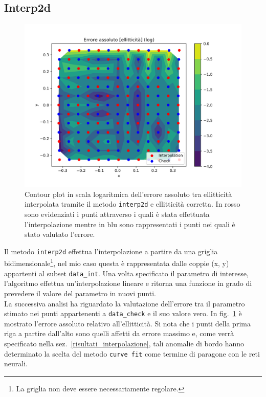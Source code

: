 \documentclass[12pt,a4paper,final]{book}
\begin{document}
\subsection{Interp2d}\label{interp2d}
\begin{figure}[t]
	\centering
	\includegraphics[scale=0.8]{../figures/errore_assoluto_ell.png}
	\caption{Contour plot in scala logaritmica dell'errore assoluto tra ellitticità interpolata tramite il metodo \texttt{interp2d} e ellitticità corretta. In rosso sono evidenziati i punti attraverso i quali è stata effettuata l'interpolazione mentre in blu sono rappresentati i punti nei quali è stato valutato l'errore.}
	\label{err_interp2d}
\end{figure}
Il metodo \texttt{interp2d} effettua l'interpolazione a partire da una griglia bidimensionale\footnote{La griglia non deve essere necessariamente regolare.}, nel mio caso questa è rappresentata dalle coppie (x, y) appartenti al subset \texttt{data\_int}. Una volta specificato il parametro di interesse, l'algoritmo effettua un'interpolazione lineare e ritorna una funzione in grado di prevedere il valore del parametro in nuovi punti. \\
La successiva analisi ha riguardato la valutazione dell'errore tra il parametro stimato nei punti appartenenti a \texttt{data\_check} e il suo valore vero. In fig.~\ref{err_interp2d} è mostrato l'errore assoluto relativo all'ellitticità.
Si nota che i punti della prima riga a partire dall'alto sono quelli affetti da errore massimo e, come verrà specificato nella sez.~\ref{risultati_interpolazione}, tali anomalie di bordo hanno determinato la scelta del metodo \texttt{curve fit} come termine di paragone con le reti neurali.
\end{document}
